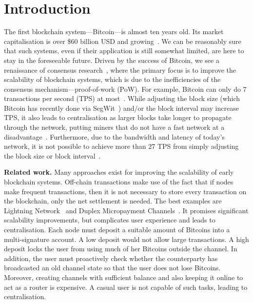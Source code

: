 \section{Introduction}

The first blockchain system---Bitcoin---is almost ten years old. 
Its market capitalisation is over \$60 billion USD and growing~\cite{bitcoinmarketcap}.
We can be reasonably sure that such systems,
even if their application is still somewhat limited,
are here to stay in the foreseeable future.
Driven by the success of Bitcoin, we see a renaissance of consensus research~\cite{luu2016elastico, kogias2016enhancing, kokoris2017omniledger},
where the primary focus is to improve the scalability of blockchain systems,
which is due to the inefficiencies of the consensus mechanism---proof-of-work (PoW).
For example, Bitcoin can only do 7 transactions per second (TPS) at most~\cite{vukolic2015quest}.
While adjusting the block size (which Bitcoin has recently done via SegWit~\cite{segwit}) and/or the block interval may increase TPS,
it also leads to centralisation as larger blocks take longer to propagate through the network,
putting miners that do not have a fast network at a disadvantage~\cite{croman2016scaling}.
Furthermore, due to the bandwidth and latency of today's network,
it is not possible to achieve more than 27 TPS from simply adjusting the block size or block interval~\cite{croman2016scaling}.

\textbf{Related work.\quad}
Many approaches exist for improving the scalability of early blockchain systems.
Off-chain transactions make use of the fact that if nodes make frequent transactions,
then it is not necessary to store every transaction on the blockchain,
only the net settlement is needed.
The best examples are Lightning Network~\cite{lightningnetwork} and Duplex Micropayment Channels~\cite{decker2015fast}.
It promises significant scalability improvements, but complicates user experience and leads to centralisation.
Each node must deposit a suitable amount of Bitcoins into a multi-signature account.
A low deposit would not allow large transactions.
A high deposit locks the user from using much of her Bitcoins outside the channel.
In addition, the user must proactively check whether the counterparty has broadcasted an old channel state so that the user does not lose Bitcoins.
Moreover, creating channels with sufficient balance and also keeping it online to act as a router is expensive.
A casual user is not capable of such tasks, leading to centralisation.

